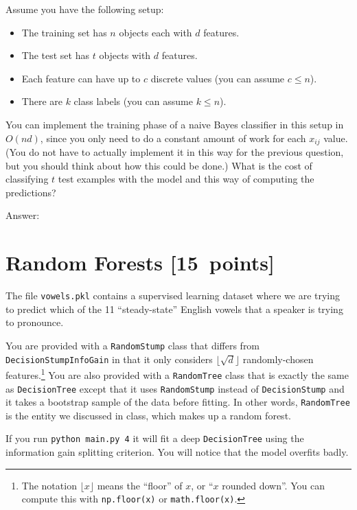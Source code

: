 \documentclass{article}
\newcommand{\blu}[1]{{\textcolor{blu}{#1}}}
\newenvironment{answer}{\par\begingroup\color{gre}Answer: }{\endgroup}
\let\ask\blu
\newcommand\pts[1]{\textcolor{pointscolour}{[#1~points]}}
\begin{document}
    Assume you have the following setup:
    \begin{itemize}
        \item The training set has $n$ objects each with $d$ features.
        \item The test set has $t$ objects with $d$ features.
        \item Each feature can have up to $c$ discrete values (you can assume $c \leq n$).
        \item There are $k$ class labels (you can assume $k \leq n$).
    \end{itemize}
    You can implement the training phase of a naive Bayes classifier in this setup in $O(nd)$, since you only need to do a constant amount of work for each $x_{ij}$ value. (You do not have to actually implement it in this way for the previous question, but you should think about how this could be done.)
    \ask{What is the cost of classifying $t$ test examples with the model and this way of computing the predictions?}
    \begin{answer}

    \end{answer}

    \clearpage
    \section{Random Forests \pts{15}}

    The file \texttt{vowels.pkl} contains a supervised learning dataset where we are trying to predict which of the 11 ``steady-state'' English vowels that a speaker is trying to pronounce.

    You are provided with a \texttt{RandomStump} class that differs from
    \texttt{DecisionStumpInfoGain} in that
    it only considers $\lfloor \sqrt{d} \rfloor$ randomly-chosen features.\footnote{The notation $\lfloor x\rfloor$ means the ``floor'' of $x$, or ``$x$ rounded down''. You can compute this with \texttt{np.floor(x)} or \texttt{math.floor(x)}.}
    You are also provided with a \texttt{RandomTree} class that is exactly the same as
    \texttt{DecisionTree} except that it uses \texttt{RandomStump} instead of
    \texttt{DecisionStump} and it takes a bootstrap sample of the data before fitting.
    In other words, \texttt{RandomTree} is the entity we discussed in class, which
    makes up a random forest.

    If you run \texttt{python main.py 4} it will fit a deep \texttt{DecisionTree}
    using the information gain splitting criterion. You will notice that the model overfits badly.
\end{document}

